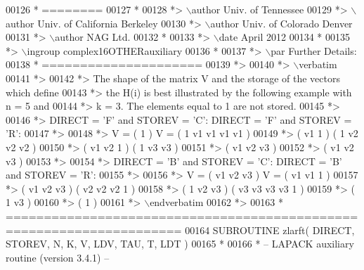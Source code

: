 \begin{DoxyCode}
00126 \textcolor{comment}{*  ========}
00127 \textcolor{comment}{*}
00128 \textcolor{comment}{*> \(\backslash\)author Univ. of Tennessee }
00129 \textcolor{comment}{*> \(\backslash\)author Univ. of California Berkeley }
00130 \textcolor{comment}{*> \(\backslash\)author Univ. of Colorado Denver }
00131 \textcolor{comment}{*> \(\backslash\)author NAG Ltd. }
00132 \textcolor{comment}{*}
00133 \textcolor{comment}{*> \(\backslash\)date April 2012}
00134 \textcolor{comment}{*}
00135 \textcolor{comment}{*> \(\backslash\)ingroup complex16OTHERauxiliary}
00136 \textcolor{comment}{*}
00137 \textcolor{comment}{*> \(\backslash\)par Further Details:}
00138 \textcolor{comment}{*  =====================}
00139 \textcolor{comment}{*>}
00140 \textcolor{comment}{*> \(\backslash\)verbatim}
00141 \textcolor{comment}{*>}
00142 \textcolor{comment}{*>  The shape of the matrix V and the storage of the vectors which define}
00143 \textcolor{comment}{*>  the H(i) is best illustrated by the following example with n = 5 and}
00144 \textcolor{comment}{*>  k = 3. The elements equal to 1 are not stored.}
00145 \textcolor{comment}{*>}
00146 \textcolor{comment}{*>  DIRECT = 'F' and STOREV = 'C':         DIRECT = 'F' and STOREV = 'R':}
00147 \textcolor{comment}{*>}
00148 \textcolor{comment}{*>               V = (  1       )                 V = (  1 v1 v1 v1 v1 )}
00149 \textcolor{comment}{*>                   ( v1  1    )                     (     1 v2 v2 v2 )}
00150 \textcolor{comment}{*>                   ( v1 v2  1 )                     (        1 v3 v3 )}
00151 \textcolor{comment}{*>                   ( v1 v2 v3 )}
00152 \textcolor{comment}{*>                   ( v1 v2 v3 )}
00153 \textcolor{comment}{*>}
00154 \textcolor{comment}{*>  DIRECT = 'B' and STOREV = 'C':         DIRECT = 'B' and STOREV = 'R':}
00155 \textcolor{comment}{*>}
00156 \textcolor{comment}{*>               V = ( v1 v2 v3 )                 V = ( v1 v1  1       )}
00157 \textcolor{comment}{*>                   ( v1 v2 v3 )                     ( v2 v2 v2  1    )}
00158 \textcolor{comment}{*>                   (  1 v2 v3 )                     ( v3 v3 v3 v3  1 )}
00159 \textcolor{comment}{*>                   (     1 v3 )}
00160 \textcolor{comment}{*>                   (        1 )}
00161 \textcolor{comment}{*> \(\backslash\)endverbatim}
00162 \textcolor{comment}{*>}
00163 \textcolor{comment}{*  =====================================================================}
00164 \textcolor{keyword}{      SUBROUTINE }zlarft( DIRECT, STOREV, N, K, V, LDV, TAU, T, LDT )
00165 \textcolor{comment}{*}
00166 \textcolor{comment}{*  -- LAPACK auxiliary routine (version 3.4.1) --}

\end{DoxyCode}
